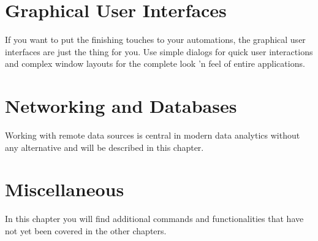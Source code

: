 \documentclass[DIV=17, parskip=half]{scrreprt}
\begin{document}
	\chapter{Graphical User Interfaces}
		If you want to put the finishing touches to your automations, the graphical user interfaces are just the thing for you. Use simple dialogs for quick user interactions and complex window layouts for the complete look 'n feel of entire applications.
		
		
	
	\chapter{Networking and Databases}
		Working with remote data sources is central in modern data analytics without any alternative and will be described in this chapter.
		
		
		
		
	\chapter{Miscellaneous}
		In this chapter you will find additional commands and functionalities that have not yet been covered in the other chapters.
		
		
		
		
		
\end{document}
